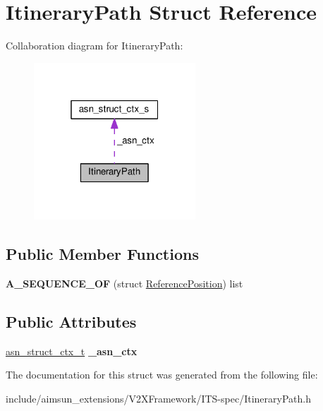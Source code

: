 \hypertarget{structItineraryPath}{}\section{Itinerary\+Path Struct Reference}
\label{structItineraryPath}


Collaboration diagram for Itinerary\+Path\+:\nopagebreak
\begin{figure}[H]
\begin{center}
\leavevmode
\includegraphics[width=172pt]{structItineraryPath__coll__graph}
\end{center}
\end{figure}
\subsection*{Public Member Functions}
\begin{DoxyCompactItemize}
\item 
{\bfseries A\+\_\+\+S\+E\+Q\+U\+E\+N\+C\+E\+\_\+\+OF} (struct \hyperlink{structReferencePosition}{Reference\+Position}) list\hypertarget{structItineraryPath_a87549287594229c0d6d65f885d6fa717}{}\label{structItineraryPath_a87549287594229c0d6d65f885d6fa717}

\end{DoxyCompactItemize}
\subsection*{Public Attributes}
\begin{DoxyCompactItemize}
\item 
\hyperlink{structasn__struct__ctx__s}{asn\+\_\+struct\+\_\+ctx\+\_\+t} {\bfseries \+\_\+asn\+\_\+ctx}\hypertarget{structItineraryPath_a2ff1d69fd86cdf2cee246aa0561c46ac}{}\label{structItineraryPath_a2ff1d69fd86cdf2cee246aa0561c46ac}

\end{DoxyCompactItemize}


The documentation for this struct was generated from the following file\+:\begin{DoxyCompactItemize}
\item 
include/aimsun\+\_\+extensions/\+V2\+X\+Framework/\+I\+T\+S-\/spec/Itinerary\+Path.\+h\end{DoxyCompactItemize}
